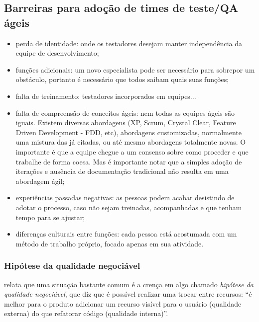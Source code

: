 \documentclass[
	12pt,				%
	openright,			%
	oneside,			%
	a4paper,			%
	english,			%
	brazil,				%
	]{abntex2}
\begin{document}
\subsection{Barreiras para adoção de times de teste/QA ágeis}
\begin{itemize}
    \item perda de identidade: onde os testadores desejam manter independência da equipe de desenvolvimento;
    \item funções adicionais: um novo especialista pode ser necessário para sobrepor um obstáculo, portanto é necessário que todos saibam quais suas funções; %
    \item falta de treinamento: testadores incorporados em equipes... %
    \item falta de compreensão de conceitos ágeis: nem todas as equipes ágeis são iguais. Existem diversas abordagens (XP, Scrum, Crystal Clear, Feature Driven Development - FDD, etc), abordagens customizadas, normalmente uma mistura das já citadas, ou até mesmo abordagens totalmente novas. O importante é que a equipe chegue a um consenso sobre como proceder e que trabalhe de forma coesa. Mas é importante notar que a simples adoção de iterações e ausência de documentação tradicional não resulta em uma abordagem ágil; %
    \item experiências passadas negativas: as pessoas podem acabar desistindo de adotar o processo, caso não sejam treinadas, acompanhadas e que tenham tempo para se ajustar;
    \item diferenças culturais entre funções: cada pessoa está acostumada com um método de trabalho próprio, focado apenas em sua atividade.
\end{itemize}


\subsubsection{Hipótese da qualidade negociável}
 relata que uma situação bastante comum é a crença em algo chamado \emph{hipótese da qualidade negociável}, que diz que é possível realizar uma trocar entre recursos: ``é melhor para o produto adicionar um recurso visível para o usuário (qualidade externa) do que refatorar código (qualidade interna)''.
\end{document}
